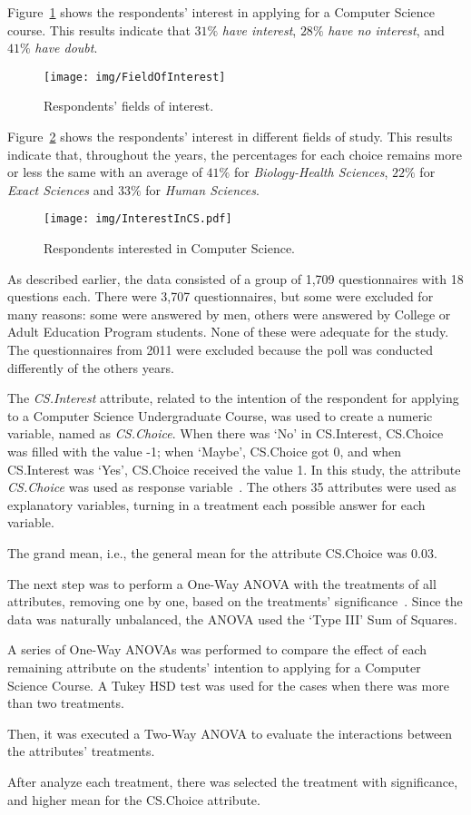 Figure~\ref{fig:FieldOfInterest} shows the respondents' interest in applying for a Computer Science course. This results indicate that $31\%$  \emph{have interest}, $28\%$  \emph{have no interest}, and $41\%$  \emph{have doubt}.

\begin{figure}%
\texttt{[image: img/FieldOfInterest]}%
\caption{Respondents' fields of interest.}%
\label{fig:FieldOfInterest}%
\end{figure}%

Figure~\ref{fig:InterestInCS.pdf} shows the respondents' interest in different fields of study. This results indicate that, throughout the years, the percentages for each choice remains more or less the same with an average of $41\%$ for \emph{Biology-Health Sciences}, $22\%$ for \emph{Exact Sciences} and $33\%$ for \emph{Human Sciences}.

\begin{figure}%
\texttt{[image: img/InterestInCS.pdf]}%
\caption{Respondents interested in Computer Science.}%
\label{fig:InterestInCS.pdf}%
\end{figure}%

As described earlier, the data consisted of a group of 1,709 questionnaires with 18 questions each. There were 3,707 questionnaires, but some were excluded for many reasons: some were answered by men, others were answered by College or Adult Education Program students. None of these were adequate for the study. The questionnaires from 2011 were excluded because the poll was conducted differently of the others years.

The \emph{CS.Interest} attribute, related to the intention of the respondent for applying to a Computer Science Undergraduate Course, was used to create a numeric variable, named as \emph{CS.Choice}. When there was `No' in CS.Interest, CS.Choice was filled with the value -1; when `Maybe', CS.Choice got 0, and when CS.Interest was `Yes', CS.Choice received the value 1. In this study, the attribute \emph{CS.Choice} was used as response variable~\cite{moore2009practice}. The others 35 attributes were used as explanatory variables, turning in a treatment each possible answer for each variable.

The grand mean, i.e., the general mean for the attribute CS.Choice was 0.03.

The next step was to perform a One-Way ANOVA with the treatments of all attributes, removing one by one, based on the treatments' significance~\cite{Chambers1990}. Since the data was naturally unbalanced, the ANOVA used the `Type III' Sum of Squares. 

A series of One-Way ANOVAs was performed to compare the effect of each remaining attribute on the students' intention to applying for a Computer Science Course. A Tukey HSD test was used for the cases when there was more than two treatments.
 
Then, it was executed a Two-Way ANOVA to evaluate the interactions between the attributes' treatments.

After analyze each treatment, there was selected the treatment with significance, and higher mean for the CS.Choice attribute.



